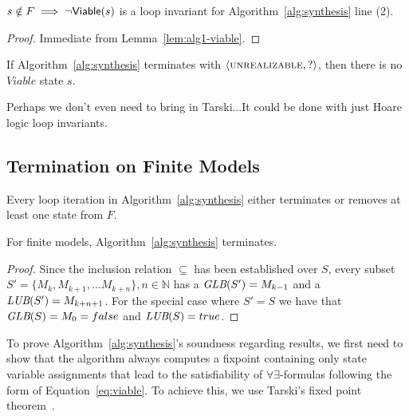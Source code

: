 \begin{corollary}
$s \notin F \implies \lnot {\mathsf {Viable}}(s)$ is a loop invariant for Algorithm~\ref{alg:synthesis} line (2).
\label{cor:alg1-nonviable}
\end{corollary}

\begin{proof}
Immediate from Lemma~\ref{lem:alg1-viable}.
\end{proof}

\begin{theorem} If Algorithm~\ref{alg:synthesis} terminates with $\langle \textsc{unrealizable}, ? \rangle$, then there is no $Viable$ state $s$.
\end{theorem}

Perhaps we don't even need to bring in Tarski...It could be done with just Hoare logic loop invariants.

\subsection{Termination on Finite Models}

\begin{lemma}
Every loop iteration in Algorithm~\ref{alg:synthesis} either terminates or removes at least one state from $F$.
\end{lemma}

\begin{theorem}
For finite models, Algorithm~\ref{alg:synthesis} terminates.
\end{theorem}




\iffalse
The system $\mathfrak{U} = \tuple{S, \subseteq}$ is a complete lattice, where every subset $S' \subseteq S$ has a greatest lower bound  $\glb(S') = \cap S'$  and a least upper bound $\lub(S') = \cup S'$.
\label{lem:altlattice}
\fi
\begin{proof}
Since the inclusion relation $\subseteq$ has been established over $S$, every subset $S' = \{M_k, M_{k+1}, \ldots M_{k+n}\}, n \in \mathbb{N}$ has a $\textit {GLB}(S') = M_{k-1}$ and a $\textit {LUB}(S') = M_{k+n+1}$. For the special case where $S' = S$ we have that $\textit {GLB}(S) = M_0 = false$ and $\textit {LUB}(S) = true$.
\end{proof}

\label{sec:soundness}
To prove Algorithm~\ref{alg:synthesis}'s soundness regarding results, we first need to show that the algorithm always computes a fixpoint containing only state variable assignments that lead to the satisfiability of $\forall\exists$-formulas following the form of Equation~\ref{eq:viable}. To achieve this, we
use Tarski's fixed point theorem~\cite{tarski1955lattice}.


